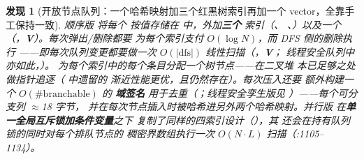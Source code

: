 \documentclass[11pt]{ctexart}
\newtheorem{finding}{发现}
\begin{document}
\begin{finding}[开放节点队列：一个哈希映射加三个红黑树索引再加一个 vector，全靠手工保持一致]
\label{find:queue}
顺序版  将每个  \emph{按值}存储在
 中，外加\textbf{三个}
 索引（、
、）以及一个 （，\textbf{V}）。每次弹出/删除都要
\emph{为每个索引}支付 $O(\log N)$，而 DFS 侧的删除执行
——即每次队列变更都要做一次
$O(|\mathrm{dfs}|)$ 线性扫描（，\textbf{V}；
线程安全队列中亦如此，）。
 为每个索引中的每个条目分配一个树节点——在二叉堆
本已足够之处做指针追逐（ 中遗留的
 渐近性能更优，且仍然存在）。每次压入还要
额外构建一个 $O(\#\mathrm{branchable})$ 的\textbf{ 域签名}
用于去重（；线程安全孪生版见
）——每个可分支列 $\approx$18 字节，
并在每次节点插入时被哈希进另外两个哈希映射。并行版
 在\textbf{单一全局互斥锁加条件变量}之下
复制了同样的四索引设计（），其
 还会\emph{在持有队列锁的同时}对每个排队节点的
稠密界数组执行一次 $O(N \cdot L)$ 扫描（:1105--1134）。
\end{finding}
\end{document}
